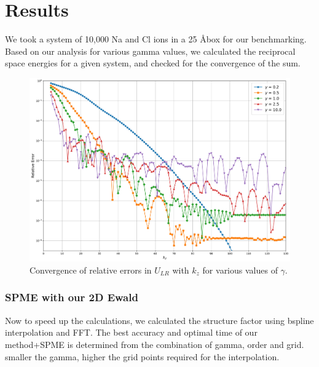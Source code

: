 \clearpage
\section{Results}
We took a system of 10,000 Na and Cl ions in a 25 \AA box for our benchmarking. Based on our analysis for various gamma values, we calculated the reciprocal space energies for a given system, and checked for the convergence of the sum. 
\begin{figure}[htbp]
    \centering
    \includegraphics[scale=0.3]{images/logerror_vs_kz_forreport.jpg}
    \caption{Convergence of relative errors in $U_{LR}$ with $k_z$ for various values of $\gamma$.}
    \label{fig:result1}
\end{figure}

\subsubsection*{SPME with our 2D Ewald}
Now to speed up the calculations, we calculated the structure factor using bspline interpolation and FFT. The best accuracy and optimal time of our method+SPME is determined from the combination of gamma, order and grid. smaller the gamma, higher the grid points required for the interpolation. 